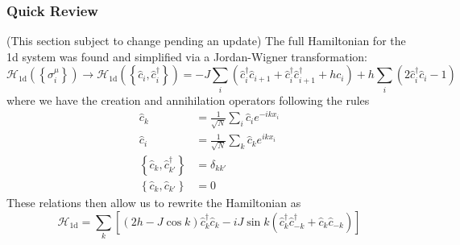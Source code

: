 \documentclass{article}
\begin{document}
	\subsubsection{Quick Review} (This section subject to change pending an update) The full Hamiltonian for the 1d system was found and simplified via a Jordan-Wigner transformation:
	$$\mathcal{H}_{1\mathrm{d}}(\left\{\sigma_i^\mu\right\})\longrightarrow \mathcal{H}_{1\mathrm{d}}(\left\{\hat{c}_i,\hat{c}_i^\dagger\right\})=-J\sum_i\left(\hat{c}_i^\dagger \hat{c}_{i+1}+\hat{c}_i^\dagger \hat{c}_{i+1}^\dagger +hc_i\right)+h\sum_i (2\hat{c}_i^\dagger \hat{c}_i-1)$$
	where we have the creation and annihilation operators following the rules
	\begin{align*}
		\hat{c}_k&=\frac{1}{\sqrt{N}}\sum_i \hat{c}_ie^{-ikx_i}\\
		\hat{c}_i&=\frac{1}{\sqrt{N}}\sum_k \hat{c}_ke^{ikx_i}\\
		\left\{\hat{c}_k,\hat{c}_{k'}^\dagger\right\}&=\delta_{kk'}\\
		\left\{\hat{c}_k,\hat{c}_{k'}\right\}&=0
	\end{align*}
	These relations then allow us to rewrite the Hamiltonian as
	$$\mathcal{H}_{1\mathrm{d}}=\sum_k\left[(2h-J\cos k)\hat{c}_k^\dagger \hat{c}_k -i J\sin k(\hat{c}_k^\dagger\hat{c}_{-k}^\dagger+\hat{c}_k\hat{c}_{-k})\right]$$
\end{document}
